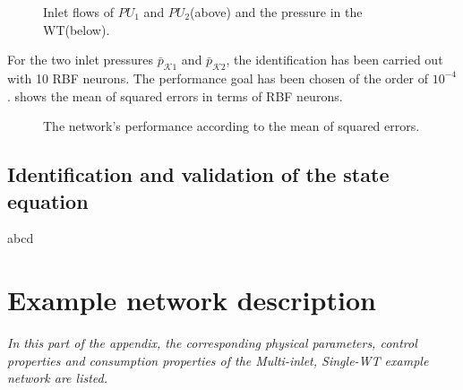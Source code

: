  \vspace{-5mm}

 \begin{figure}[H]
 \centering
 \hspace{-4.5mm}
  
 \vspace{-2.5mm}
 \caption{Inlet flows of $PU_1$ and $PU_2$(above) and the pressure in the WT(below).}
 \label{fig:WT_sigma1}
 \end{figure}

 \vspace{-3mm}

For the two inlet pressures $\bar{p}_{\mathcal{K}1}$ and $\bar{p}_{\mathcal{K}2}$, the identification has been carried out with 10 RBF neurons. The performance goal has been chosen of the order of $10^{-4}$.  shows the mean of squared errors in terms of RBF neurons. 

 \begin{figure}[H]
 \centering
  
 \vspace{-2.5mm}
 \caption{The network’s performance according to the mean of squared errors.}
 \label{fig:MSE_output}
 \end{figure}

 \vspace{-3mm}



\section{Identification and validation of the state equation}
\label{identification_and_validation_of_the_state_eq}  

abcd

\chapter{Example network description}
\label{physical_properties_example1}

\emph{In this part of the appendix, the corresponding physical parameters, control properties and consumption properties of the Multi-inlet, Single-WT example network are listed.}




